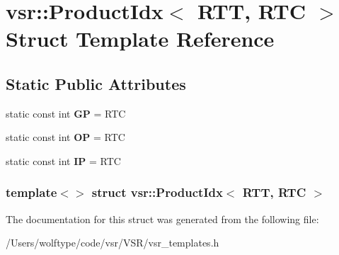 \hypertarget{structvsr_1_1_product_idx_3_01_r_t_t_00_01_r_t_c_01_4}{\section{vsr\-:\-:Product\-Idx$<$ R\-T\-T, R\-T\-C $>$ Struct Template Reference}
\label{structvsr_1_1_product_idx_3_01_r_t_t_00_01_r_t_c_01_4}
}
\subsection*{Static Public Attributes}
\begin{DoxyCompactItemize}
\item 
\hypertarget{structvsr_1_1_product_idx_3_01_r_t_t_00_01_r_t_c_01_4_a09359cb53269f374d1afc09eff339ea8}{static const int {\bfseries G\-P} = R\-T\-C}\label{structvsr_1_1_product_idx_3_01_r_t_t_00_01_r_t_c_01_4_a09359cb53269f374d1afc09eff339ea8}

\item 
\hypertarget{structvsr_1_1_product_idx_3_01_r_t_t_00_01_r_t_c_01_4_a23f1f9970d1b061f08bea83f22edc57e}{static const int {\bfseries O\-P} = R\-T\-C}\label{structvsr_1_1_product_idx_3_01_r_t_t_00_01_r_t_c_01_4_a23f1f9970d1b061f08bea83f22edc57e}

\item 
\hypertarget{structvsr_1_1_product_idx_3_01_r_t_t_00_01_r_t_c_01_4_a2aa3ad887d66d07e4142140f6486b4c1}{static const int {\bfseries I\-P} = R\-T\-C}\label{structvsr_1_1_product_idx_3_01_r_t_t_00_01_r_t_c_01_4_a2aa3ad887d66d07e4142140f6486b4c1}

\end{DoxyCompactItemize}
\subsubsection*{template$<$$>$ struct vsr\-::\-Product\-Idx$<$ R\-T\-T, R\-T\-C $>$}



The documentation for this struct was generated from the following file\-:\begin{DoxyCompactItemize}
\item 
/\-Users/wolftype/code/vsr/\-V\-S\-R/vsr\-\_\-templates.\-h\end{DoxyCompactItemize}
